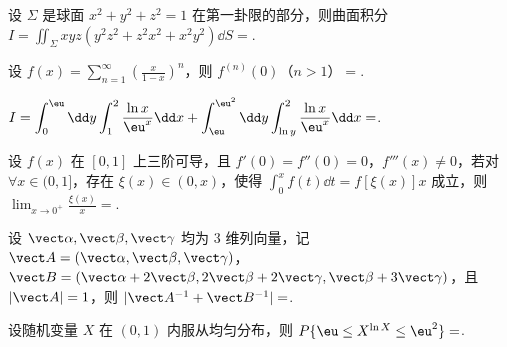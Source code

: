 \begin{question}[index=11]
设 $\Sigma$ 是球面 $x^2+y^2+z^2=1$ 在第一卦限的部分，则曲面积分 $\displaystyle I=\iint_\Sigma xyz(y^2z^2+z^2x^2+x^2y^2)\dd S=$\fillin.
\end{question}
\QuestionBreak

\begin{question}[index=12]
设 $\displaystyle f(x)=\sum_{n=1}^\infty\left(\frac x{1-x}\right)^n$，则 $f^{(n)}(0)$（$n>1$）$=$\fillin.
\end{question}
\QuestionBreak

\begin{question}[index=13]
$\displaystyle I=\int_0^\eu\dd y\int_1^2\frac{\ln x}{\eu^x}\dd x+\int_\eu^{\eu^2}\dd y\int_{\ln y}^2\frac{\ln x}{\eu^x}\dd x=$\fillin.
\end{question}
\QuestionBreak

\begin{question}[index=14]
设 $f(x)$ 在 $[0,1]$ 上三阶可导，且 $f'(0)=f''(0)=0$，$f'''(x)\ne0$，若对 $\forall x\in(0,1]$，存在 $\xi(x)\in(0,x)$，使得 $\displaystyle\int_0^xf(t)\dd t=f[\xi(x)]x$ 成立，则 $\displaystyle\lim_{x\to0^+}\frac{\xi(x)}x=$\fillin.
\end{question}
\QuestionBreak

\begin{question}[index=15]
设 $\vect\alpha,\vect\beta,\vect\gamma$ 均为 $3$ 维列向量，记 $\vect A=(\vect\alpha,\vect\beta,\vect\gamma)$，$\vect B=(\vect\alpha+2\vect\beta,2\vect\beta+2\vect\gamma,\vect\beta+3\vect\gamma)$，且 $|\vect A|=1$，则 $|\vect A^{-1}+\vect B^{-1}|=$\fillin.
\end{question}
\QuestionBreak

\begin{question}[index=16]
设随机变量 $X$ 在 $(0,1)$ 内服从均匀分布，则 $P\{\eu\le X^{\ln X}\le\eu^2\}=$\fillin.
\end{question}
